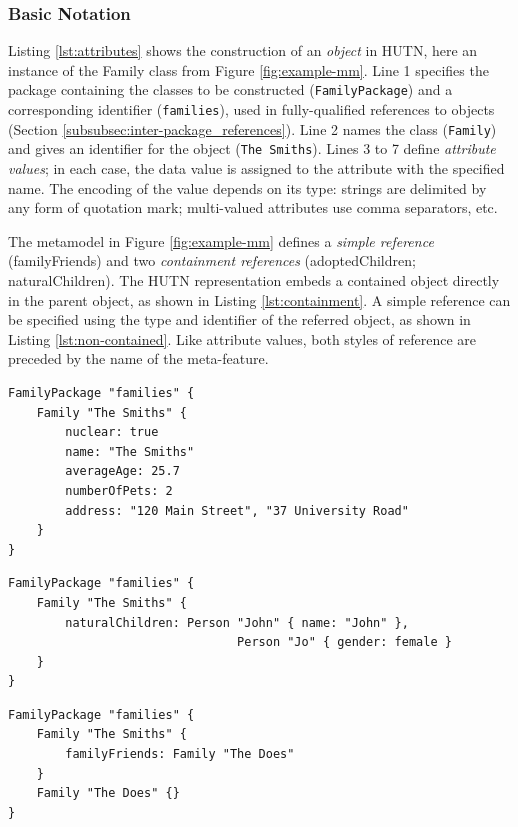 \subsubsection{Basic Notation}
Listing \ref{lst:attributes} shows the construction of an \emph{object} in HUTN, here an instance of the Family class from Figure \ref{fig:example-mm}. Line 1 specifies the package containing the classes to be constructed (\texttt{FamilyPackage}) and a corresponding identifier (\texttt{families}), used in fully-qualified references to objects (Section \ref{subsubsec:inter-package_references}). Line 2 names the class (\texttt{Family}) and gives an identifier for the object (\texttt{The Smiths}). Lines 3 to 7 define \emph{attribute values}; in each case, the data value is assigned to the attribute with the specified name. The encoding of the value depends on its type: strings are delimited by any form of quotation mark; multi-valued attributes use comma separators, etc.

The metamodel in Figure \ref{fig:example-mm} defines a \emph{simple reference} (familyFriends) and two \emph{containment references} (adoptedChildren; naturalChildren). The HUTN representation embeds a contained object directly in the parent object, as shown in Listing \ref{lst:containment}. A simple reference can be specified using the type and identifier of the referred object, as shown in Listing \ref{lst:non-contained}. Like attribute values, both styles of reference are preceded by the name of the meta-feature.

\begin{lstlisting}[caption=Specifying attributes with HUTN., label=lst:attributes, language=HutnFamilies]
FamilyPackage "families" {
    Family "The Smiths" {
        nuclear: true
        name: "The Smiths"
        averageAge: 25.7
        numberOfPets: 2
        address: "120 Main Street", "37 University Road"
    }
}
\end{lstlisting}

\begin{lstlisting}[caption=Specifying a containment reference with HUTN., label=lst:containment, language=HutnFamilies]
FamilyPackage "families" {
    Family "The Smiths" {
        naturalChildren: Person "John" { name: "John" },
                                Person "Jo" { gender: female }
    }
}
\end{lstlisting}


\begin{lstlisting}[caption=Specifying a simple reference with HUTN., label=lst:non-contained, language=HutnFamilies]
FamilyPackage "families" {
    Family "The Smiths" {
        familyFriends: Family "The Does"
    }
    Family "The Does" {}
}
\end{lstlisting}


